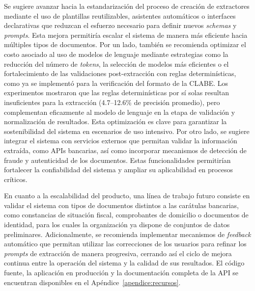 Se sugiere avanzar hacia la estandarización del proceso de creación de extractores mediante el uso de plantillas reutilizables, asistentes automáticos o interfaces declarativas que reduzcan el esfuerzo necesario para definir nuevos \textit{schemas} y \textit{prompts}. Esta mejora permitiría escalar el sistema de manera más eficiente hacia múltiples tipos de documentos. Por un lado, también se recomienda optimizar el costo asociado al uso de modelos de lenguaje mediante estrategias como la reducción del número de \textit{tokens}, la selección de modelos más eficientes o el fortalecimiento de las validaciones post-extracción con reglas determinísticas, como ya se implementó para la verificación del formato de la CLABE. Los experimentos mostraron que las reglas determinísticas por sí solas resultan insuficientes para la extracción (4.7--12.6\% de precisión promedio), pero complementan eficazmente al modelo de lenguaje en la etapa de validación y normalización de resultados. Esta optimización es clave para garantizar la sostenibilidad del sistema en escenarios de uso intensivo. Por otro lado, se sugiere integrar el sistema con servicios externos que permitan validar la información extraída, como APIs bancarias, así como incorporar mecanismos de detección de fraude y autenticidad de los documentos. Estas funcionalidades permitirían fortalecer la confiabilidad del sistema y ampliar su aplicabilidad en procesos críticos.

En cuanto a la escalabilidad del producto, una línea de trabajo futuro consiste en validar el sistema con tipos de documentos distintos a las carátulas bancarias, como constancias de situación fiscal, comprobantes de domicilio o documentos de identidad, para los cuales la organización ya dispone de conjuntos de datos preliminares. Adicionalmente, se recomienda implementar mecanismos de \textit{feedback} automático que permitan utilizar las correcciones de los usuarios para refinar los \textit{prompts} de extracción de manera progresiva, cerrando así el ciclo de mejora continua entre la operación del sistema y la calidad de sus resultados. El código fuente, la aplicación en producción y la documentación completa de la API se encuentran disponibles en el Apéndice~\ref{apendice:recursos}.